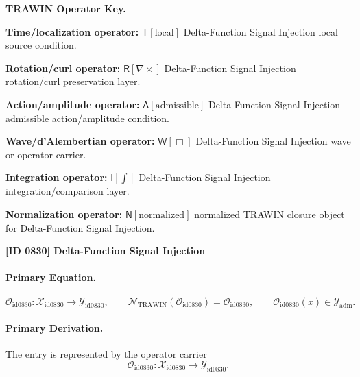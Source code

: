 \par\vspace{0.45\baselineskip}
\noindent\begin{minipage}[t]{\linewidth}
\begingroup
\small
\raggedright
\textbf{TRAWIN Operator Key.}\par
\noindent\textbf{Time/localization operator:} $\mathsf{T}\!\left[\mathrm{local}\right]$ Delta-Function Signal Injection local source condition.\par
\noindent\textbf{Rotation/curl operator:} $\mathsf{R}\!\left[\nabla\times\right]$ Delta-Function Signal Injection rotation/curl preservation layer.\par
\noindent\textbf{Action/amplitude operator:} $\mathsf{A}\!\left[\mathrm{admissible}\right]$ Delta-Function Signal Injection admissible action/amplitude condition.\par
\noindent\textbf{Wave/d'Alembertian operator:} $\mathsf{W}\!\left[\Box\right]$ Delta-Function Signal Injection wave or operator carrier.\par
\noindent\textbf{Integration operator:} $\mathsf{I}\!\left[\int\right]$ Delta-Function Signal Injection integration/comparison layer.\par
\noindent\textbf{Normalization operator:} $\mathsf{N}\!\left[\mathrm{normalized}\right]$ normalized TRAWIN closure object for Delta-Function Signal Injection.\par
\endgroup
\end{minipage}

\clearpage
\noindent\textbf{[ID 0830] Delta-Function Signal Injection}\par
\vspace{0.35em}
\paragraph{Primary Equation.}
\[
\mathcal{O}_{\mathrm{id0830}}:\mathcal{X}_{\mathrm{id0830}}\longrightarrow \mathcal{Y}_{\mathrm{id0830}},\qquad
\mathcal{N}_{\mathrm{TRAWIN}}(\mathcal{O}_{\mathrm{id0830}})=\mathcal{O}_{\mathrm{id0830}},\qquad
\mathcal{O}_{\mathrm{id0830}}(x)\in\mathcal{Y}_{\mathrm{adm}}.
\]

\paragraph{Primary Derivation.} The entry is represented by the operator carrier\[
\mathcal{O}_{\mathrm{id0830}}:\mathcal{X}_{\mathrm{id0830}}\longrightarrow \mathcal{Y}_{\mathrm{id0830}}.
\]

